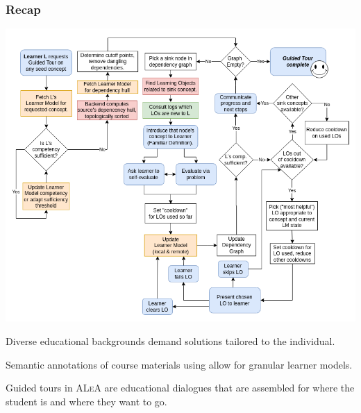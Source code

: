 \documentclass[aspectratio=169, usenames, dvipsnames]{beamer}
\def\ALeA{\textsc{ALeA}\xspace}
\begin{document}
\begin{frame}
\frametitle{Recap}
\begin{minipage}{0.7\textwidth}
\vspace*{-10px}
\includegraphics[height=0.9\textheight,keepaspectratio]{images/gt_algorithm_square}
\end{minipage}%
\begin{minipage}{0.3\textwidth}
Diverse educational backgrounds demand solutions tailored to the individual.\bigskip

Semantic annotations of course materials using \sTeX allow for granular learner models.\bigskip

Guided tours in \ALeA are educational dialogues that are assembled for where the student is and where they want to go.
\end{minipage}%
\end{frame}
\end{document}
